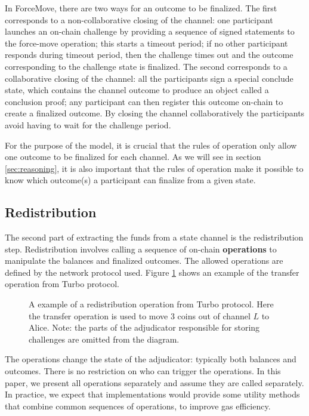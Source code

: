 In ForceMove, there are two ways for an outcome to be finalized.
The first corresponds to a non-collaborative closing of the channel:
one participant launches an on-chain challenge by providing a sequence of signed statements to the force-move operation;
this starts a timeout period;
if no other participant responds during timeout period, then the challenge times out and the outcome
corresponding to the challenge state is finalized.
The second corresponds to a collaborative closing of the channel:
all the participants sign a special conclude state, which contains the channel outcome to
produce an object called a conclusion proof; 
any participant can then register this outcome on-chain to create a finalized outcome.
By closing the channel collaboratively the participants avoid having to wait for the challenge period.

For the purpose of the model, it is crucial that the rules of operation only allow one outcome to be finalized for each channel.
As we will see in section \ref{sec:reasoning}, it is also important that the rules of operation make it possible to know which outcome(s) a participant can finalize from a given state.

\subsection{Redistribution}\label{sec:redistribution}

The second part of extracting the funds from a state channel is the redistribution step.
Redistribution involves calling a sequence of on-chain \textbf{operations} to manipulate
the balances and finalized outcomes.
The allowed operations are defined by the network protocol used.
Figure \ref{fig:redistribution} shows an example of the transfer operation from Turbo protocol.

\begin{figure}[h]\centering
  \makebox[\textwidth][c]{}
  \caption{
    A example of a redistribution operation from Turbo protocol.
    Here the transfer operation is used to move $3$ coins out of channel $L$ to Alice.
    Note: the parts of the adjudicator responsible for storing challenges are omitted from the diagram.
  }\label{fig:redistribution}
\end{figure}

The operations change the state of the adjudicator: typically both balances and outcomes.
There is no restriction on who can trigger the operations.
In this paper, we present all operations separately and assume they are called separately.
In practice, we expect that implementations would provide some utility methods that combine
common sequences of operations, to improve gas efficiency.

